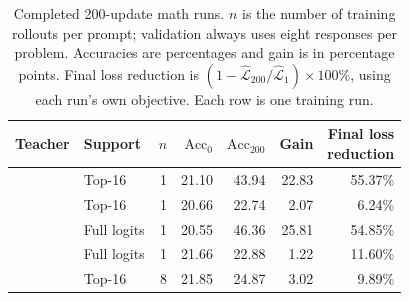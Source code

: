 \begin{table}[htbp]
\centering
\normalsize
\setlength{\tabcolsep}{5pt}
\caption{Completed 200-update \QwenOneSevenNT{} math runs. $n$ is the number of training rollouts per prompt; validation always uses eight responses per problem. Accuracies are percentages and gain is in percentage points. Final loss reduction is $(1-\widehat{\mathcal L}_{200}/\widehat{\mathcal L}_1)\times100\%$, using each run's own objective. Each row is one training run.}
  \label{tab:qwen-math-200-ablation}
  \begin{tabular}{llrrrrr}
\hline
Teacher & Support & $n$ & $\mathrm{Acc}_0$ & $\mathrm{Acc}_{200}$ & Gain & \shortstack{Final loss\\reduction} \\
\hline
\QwenRLMath{} & Top-16 & 1 & 21.10 & 43.94 & 22.83 & 55.37\% \\
\QwenFourNT{} & Top-16 & 1 & 20.66 & 22.74 & 2.07 & 6.24\% \\
\QwenRLMath{} & Full logits & 1 & 20.55 & 46.36 & 25.81 & 54.85\% \\
\QwenFourNT{} & Full logits & 1 & 21.66 & 22.88 & 1.22 & 11.60\% \\
\QwenFourNT{} & Top-16 & 8 & 21.85 & 24.87 & 3.02 & 9.89\% \\
\hline
\end{tabular}


\end{table}
